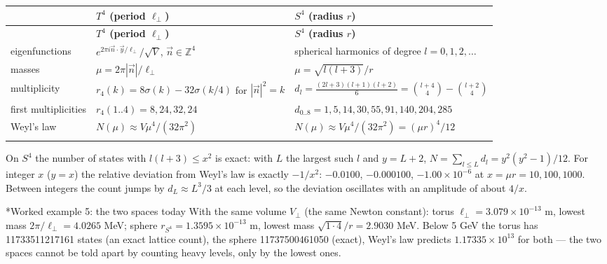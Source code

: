 \documentclass[10pt,a4paper]{article}
\makeatletter
\renewcommand\subsubsection{\@startsection{subsubsection}{3}{\z@}{-3.25ex\@plus -1ex \@minus -.2ex}{1.5ex \@plus .2ex}{\normalfont\normalsize\bfseries\raggedright}}
\makeatother
\begin{document}
{\small
\begin{longtable}{>{\raggedright\arraybackslash}p{}>{\raggedright\arraybackslash}p{}>{\raggedright\arraybackslash}p{}}
\toprule
\textbf{} & \textbf{$T^4$ (period $\ell_\perp$)} & \textbf{$S^4$ (radius $r$)} \\
\midrule\endfirsthead
\toprule
\textbf{} & \textbf{$T^4$ (period $\ell_\perp$)} & \textbf{$S^4$ (radius $r$)} \\
\midrule\endhead
\endfoot
\bottomrule\endlastfoot
eigenfunctions & $e^{2\pi i\vec n\cdot\vec y/\ell_\perp}/\sqrt V$, $\vec n\in\mathbb Z^4$ & spherical harmonics of degree $l=0,1,2,\dots$ \\
masses & $\mu=2\pi|\vec n|/\ell_\perp$ & $\mu=\sqrt{l(l+3)}/r$ \\
multiplicity & $r_4(k)=8\sigma(k)-32\sigma(k/4)$ for $|\vec n|^2=k$ & $d_l=\frac{(2l+3)(l+1)(l+2)}6=\binom{l+4}4-\binom{l+2}4$ \\
first multiplicities & $r_4(1..4)=8,24,32,24$ & $d_{0..8}=1,5,14,30,55,91,140,204,285$ \\
Weyl’s law & $N(\mu)\approx V\mu^4/(32\pi^2)$ & $N(\mu)\approx V\mu^4/(32\pi^2)=(\mu r)^4/12$ \\*
\end{longtable}}
On $S^4$ the number of states with $l(l+3)\le x^2$ is exact: with $L$ the largest such $l$ and $y=L+2$, $N=\sum_{l\le L}d_l=y^2(y^2-1)/12$. For integer $x$ ($y=x$) the relative deviation from Weyl’s law is exactly $-1/x^2$: $-0.0100$, $-0.000100$, $-1.00\times10^{-6}$ at $x=\mu r=10,100,1000$. Between integers the count jumps by $d_L\approx L^3/3$ at each level, so the deviation oscillates with an amplitude of about $4/x$.

\subsubsection*{Worked example 5: the two spaces today}
With the same volume $V_\perp$ (the same Newton constant): torus $\ell_\perp=3.079\times10^{-13}$ m, lowest mass $2\pi/\ell_\perp=4.0265$ MeV; sphere $r_{S^4}=1.3595\times10^{-13}$ m, lowest mass $\sqrt{1\cdot4}/r=2.9030$ MeV. Below 5 GeV the torus has 11733511217161 states (an exact lattice count), the sphere 11737500461050 (exact), Weyl’s law predicts $1.17335\times10^{13}$ for both — the two spaces cannot be told apart by counting heavy levels, only by the lowest ones.
\end{document}
